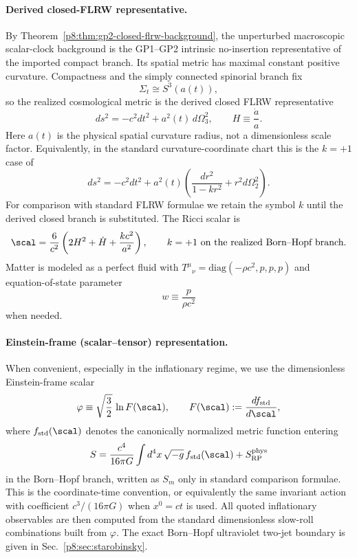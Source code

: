 \documentclass[12pt,a4paper]{article}
\begin{document}
\paragraph{Derived closed-FLRW representative.}
By Theorem~\ref{p8:thm:gp2-closed-flrw-background}, the unperturbed macroscopic scalar-clock background is the GP1--GP2 intrinsic no-insertion representative of the imported compact branch.  Its spatial metric has maximal constant positive curvature.  Compactness and the simply connected spinorial branch fix
\[
\Sigma_t\cong S^3(a(t)),
\]
so the realized cosmological metric is the derived closed FLRW representative
\begin{equation}
ds^2 = -c^2 dt^2 + a^2(t)\,d\Omega_3^2,
\qquad
H \equiv \frac{\dot a}{a}.
\label{p8:eq:flrw_metric_std}
\end{equation}
Here \(a(t)\) is the physical spatial curvature radius, not a dimensionless scale factor.  Equivalently, in the standard curvature-coordinate chart this is the $k=+1$ case of
\[
ds^2 = -c^2 dt^2 + a^2(t)\left(\frac{dr^2}{1-k r^2}+r^2 d\Omega_2^2\right).
\]
For comparison with standard FLRW formulae we retain the symbol $k$ until the derived closed branch is substituted.  The Ricci scalar is
\begin{equation}
\scal = \frac{6}{c^2}\left(2H^2+\dot H+\frac{k c^2}{a^2}\right),
\qquad k=+1\ \text{on the realized Born--Hopf branch}.
\label{p8:eq:ricci_flrw_std}
\end{equation}
Matter is modeled as a perfect fluid with
$T^\mu{}_\nu=\mathrm{diag}(-\rho c^2,p,p,p)$ and
equation-of-state parameter
\[
w\equiv \frac{p}{\rho c^2}
\]
when needed.


\paragraph{Einstein-frame (scalar--tensor) representation.}
When convenient, especially in the inflationary regime, we use the
dimensionless Einstein-frame scalar
\begin{equation}
\varphi \equiv \sqrt{\frac{3}{2}}\,\ln F(\scal),
\qquad
F(\scal):=\frac{df_{\rm std}}{d\scal},
\label{p8:eq:scalaron_map_std}
\end{equation}
where \(f_{\rm std}(\scal)\) denotes the canonically normalized metric function entering
\[
S=\frac{c^4}{16\pi G}\int d^4x\,\sqrt{-g}\,f_{\rm std}(\scal)+S_{\rm RP}^{\rm phys}
\]
in the Born--Hopf branch, written as \(S_m\) only in standard comparison formulae.  This is the coordinate-time convention, or equivalently the same invariant action with coefficient \(c^3/(16\pi G)\) when \(x^0=ct\) is used.
All quoted inflationary observables are then computed from the standard
dimensionless slow-roll combinations built from \(\varphi\). The exact
Born--Hopf ultraviolet two-jet boundary is given in
Sec.~\ref{p8:sec:starobinsky}.
\end{document}
